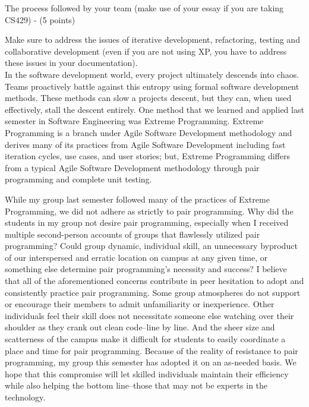 The process followed by your team (make use of your essay if you are taking CS429) - (5 points)

Make sure to address the issues of iterative development, refactoring, testing and collaborative development (even if you are not using XP, you have to address these issues in your documentation).
\\

In the software development world, every project ultimately descends into chaos. Teams proactively battle against this entropy using formal software development methods. These methods can slow a projects descent, but they can, when used effectively, stall the descent entirely. One method that we learned and applied last semester in Software Engineering was Extreme Programming. Extreme Programming is a branch under Agile Software Development methodology and derives many of its practices from Agile Software Development including fast iteration cycles, use cases, and user stories; but, Extreme Programming differs from a typical Agile Software Development methodology through pair programming and complete unit testing. 

While my group last semester followed many of the practices of Extreme Programming, we did not adhere as strictly to pair programming. Why did the students in my group not desire pair programming, especially when I received multiple second-person accounts of groups that flawlessly utilized pair programming? Could group dynamic, individual skill, an unnecessary byproduct of our interspersed and erratic location on campus at any given time, or something else determine pair programming’s necessity and success? I believe that all of the aforementioned concerns contribute in peer hesitation to adopt and consistently practice pair programming. Some group atmospheres do not support or encourage their members to admit unfamiliarity or inexperience. Other individuals feel their skill does not necessitate someone else watching over their shoulder as they crank out clean code–line by line. And the sheer size and scatterness of the campus make it difficult for students to easily coordinate a place and time for pair programming. Because of the reality of resistance to pair programming, my group this semester has adopted it on an as-needed basis. We hope that this compromise will let skilled individuals maintain their efficiency while also helping the bottom line–those that may not be experts in the technology.

